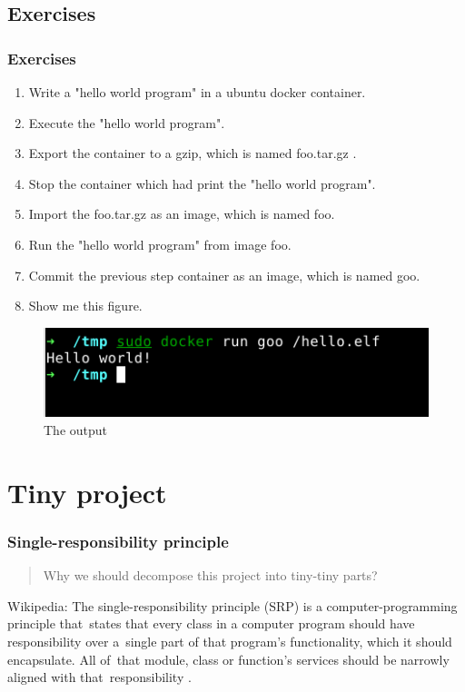 \documentclass{beamer}
\begin{document}
\subsection{Exercises}
\begin{frame}
    \frametitle{Exercises}
    \begin{enumerate}
        \item Write a "hello world program" in a ubuntu docker container.
        \item Execute the "hello world program".
        \item Export the container to a gzip, which is named foo.tar.gz .
        \item Stop the container which had print the "hello world program".
        \item Import the foo.tar.gz as an image, which is named foo.
        \item Run the "hello world program" from image foo.
        \item Commit the previous step container as an image, which is named goo.
        \item Show me this figure.
    \end{enumerate}
    \begin{figure}
        \centering\includegraphics[width=.5\textwidth]{goo.png}
        \caption{The output}
    \end{figure}
\end{frame}

\section{Tiny project}
\begin{frame}
    \frametitle{Single-responsibility principle}
    \begin{quote}
        Why we should decompose this project into tiny-tiny parts?
    \end{quote}

    \begin{block}{Wikipedia:}
        The single-responsibility principle (SRP) is a computer-programming principle that\
        states that every class in a computer program should have responsibility over a\
        single part of that program's functionality, which it should encapsulate. All of\
        that module, class or function's services should be narrowly aligned with that\
        responsibility \cite{SRP_wiki}.
    \end{block}
\end{frame}
\end{document}
